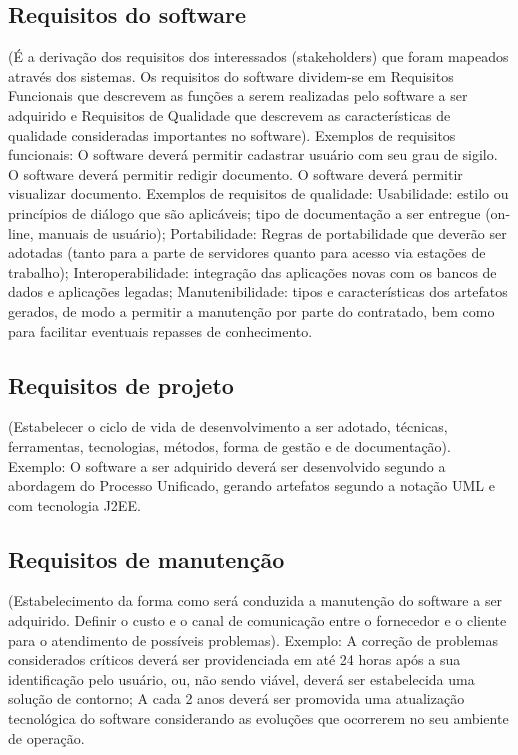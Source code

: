 \subsection{Requisitos do software}
(É a derivação dos requisitos dos interessados (stakeholders) que foram
mapeados através dos sistemas. Os requisitos do software dividem-se em
Requisitos Funcionais que descrevem as funções a serem realizadas pelo software
a ser adquirido e Requisitos de Qualidade que descrevem as características de
qualidade consideradas importantes no software).
Exemplos de requisitos funcionais:
O software deverá permitir cadastrar usuário com seu grau de sigilo.
O software deverá permitir redigir documento.
O software deverá permitir visualizar documento.
Exemplos de requisitos de qualidade:
Usabilidade: estilo ou princípios de diálogo que são aplicáveis; tipo
de documentação a ser entregue (on-line, manuais de usuário);
Portabilidade: Regras de portabilidade que deverão ser adotadas
(tanto para a parte de servidores quanto para acesso via estações de
trabalho);
Interoperabilidade: integração das aplicações novas com os bancos
de dados e aplicações legadas;
Manutenibilidade: tipos e características dos artefatos gerados, de
modo a permitir a manutenção por parte do contratado, bem como para facilitar
eventuais repasses de conhecimento.

\subsection{Requisitos de projeto}
(Estabelecer o ciclo de vida de desenvolvimento a ser adotado, técnicas,
ferramentas, tecnologias, métodos, forma de gestão e de documentação).
Exemplo: O software a ser adquirido deverá ser desenvolvido segundo a
abordagem do Processo Unificado, gerando artefatos segundo a notação
UML e com tecnologia J2EE.

\subsection{Requisitos de manutenção}
(Estabelecimento da forma como será conduzida a manutenção do
software a ser adquirido. Definir o custo e o canal de comunicação entre o
fornecedor e o cliente para o atendimento de possíveis problemas).
Exemplo: A correção de problemas considerados críticos deverá ser
providenciada em até 24 horas após a sua identificação pelo usuário, ou, não
sendo viável, deverá ser estabelecida uma solução de contorno; A cada 2
anos deverá ser promovida uma atualização tecnológica do software
considerando as evoluções que ocorrerem no seu ambiente de operação.

